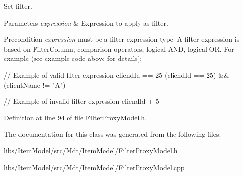 Set filter. 


\begin{DoxyParams}{Parameters}
{\em expression} & Expression to apply as filter. \\
\hline
\end{DoxyParams}
\begin{DoxyPrecond}{Precondition}
{\itshape expression} must be a filter expression type. A filter expression is based on Filter\+Column, comparison operators, logical A\+ND, logical OR. For example (see example code above for details)\+: 
\begin{DoxyCode}
\textcolor{comment}{// Example of valid filter expression}
cliendId == 25
(cliendId == 25) && (clientName != \textcolor{stringliteral}{"A"})

\textcolor{comment}{// Example of invalid filter expression}
cliendId + 5
\end{DoxyCode}
 
\end{DoxyPrecond}


Definition at line 94 of file Filter\+Proxy\+Model.\+h.



The documentation for this class was generated from the following files\+:\begin{DoxyCompactItemize}
\item 
libs/\+Item\+Model/src/\+Mdt/\+Item\+Model/Filter\+Proxy\+Model.\+h\item 
libs/\+Item\+Model/src/\+Mdt/\+Item\+Model/Filter\+Proxy\+Model.\+cpp\end{DoxyCompactItemize}
